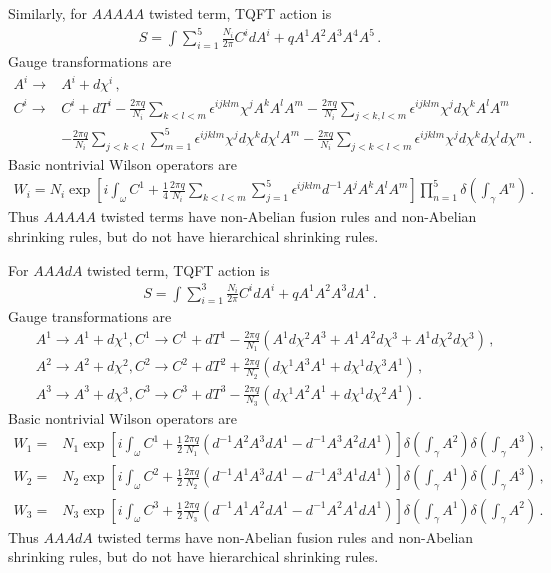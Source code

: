 \documentclass[11pt,nofootinbib,preprint]{revtex4-1}
\begin{document}
Similarly, for $AAAAA$ twisted term, TQFT action is
\begin{align}
	S=\int{\sum_{i=1}^5{\frac{N_i}{2\pi}C^idA^i+qA^1A^2A^3A^4A^5}}\,.
\end{align}
Gauge transformations are 
\begin{align}
	A^i\rightarrow& A^i+d\chi ^i \,,\nonumber
	\\
	C^i\rightarrow& C^i+dT^i-\frac{2\pi q}{N_i}\sum_{k<l<m}{\epsilon ^{ijklm}}\chi ^jA^kA^lA^m-\frac{2\pi q}{N_i}\sum_{j<k,l<m}{\epsilon ^{ijklm}}\chi ^jd\chi ^kA^lA^m \nonumber
	\\
	&-\frac{2\pi q}{N_i}\sum_{j<k<l}{\sum_{m=1}^5{\epsilon ^{ijklm}}}\chi ^jd\chi ^kd\chi ^lA^m-\frac{2\pi q}{N_i}\sum_{j<k<l<m}{\epsilon ^{ijklm}}\chi ^jd\chi ^kd\chi ^ld\chi ^m \,.
\end{align}
Basic nontrivial Wilson operators are
\begin{align}
	W_i=N_i\exp \left[ i\int_{\omega}{C^1+\frac{1}{4}\frac{2\pi q}{N_i}\sum_{k<l<m}{\sum_{j=1}^5{\epsilon ^{ijklm}}}d^{-1}A^jA^kA^lA^m} \right] \prod_{n=1}^5{\delta \left( \int_{\gamma}{A^n} \right)}\,.
\end{align}
Thus $AAAAA$ twisted terms have non-Abelian fusion rules and non-Abelian shrinking rules, but do not have hierarchical shrinking rules.

For $AAAdA$ twisted term, TQFT action is
\begin{align}
	S=\int{\sum_{i=1}^3{\frac{N_i}{2\pi}}C^idA^i}+qA^1A^2A^3dA^1\,.\label{eqD10}
\end{align}
Gauge transformations are
\begin{align}
	&A^1\rightarrow A^1+d\chi ^1,C^1\rightarrow C^1+dT^1-\frac{2\pi q}{N_1}\left( A^1d\chi ^2A^3+A^1A^2d\chi ^3+A^1d\chi ^2d\chi ^3 \right) \,,\nonumber
	\\
	&A^2\rightarrow A^2+d\chi ^2,C^2\rightarrow C^2+dT^2+\frac{2\pi q}{N_2}\left( d\chi ^1A^3A^1+d\chi ^1d\chi ^3A^1 \right) \,,\nonumber
	\\
	&A^3\rightarrow A^3+d\chi ^3,C^3\rightarrow C^3+dT^3-\frac{2\pi q}{N_3}\left( d\chi ^1A^2A^1+d\chi ^1d\chi ^2A^1 \right) \,.
\end{align}
Basic nontrivial Wilson operators are
\begin{align}
	W_1=&N_1\exp \left[ i\int_{\omega}{C^1+\frac{1}{2}\frac{2\pi q}{N_1}\left( d^{-1}A^2A^3dA^1-d^{-1}A^3A^2dA^1 \right)} \right] \delta \left( \int_{\gamma}{A^2} \right) \delta \left( \int_{\gamma}{A^3} \right) \,,\nonumber
	\\
	W_2=&N_2\exp \left[ i\int_{\omega}{C^2+\frac{1}{2}\frac{2\pi q}{N_2}\left( d^{-1}A^1A^3dA^1-d^{-1}A^3A^1dA^1 \right)} \right] \delta \left( \int_{\gamma}{A^1} \right) \delta \left( \int_{\gamma}{A^3} \right) \,,\nonumber
	\\
	W_3=&N_3\exp \left[ i\int_{\omega}{C^3+\frac{1}{2}\frac{2\pi q}{N_3}\left( d^{-1}A^1A^2dA^1-d^{-1}A^2A^1dA^1 \right)} \right] \delta \left( \int_{\gamma}{A^1} \right) \delta \left( \int_{\gamma}{A^2} \right) \,.
\end{align}
Thus $AAAdA$ twisted terms have non-Abelian fusion rules and non-Abelian shrinking rules, but do not have hierarchical shrinking rules.
\end{document}

